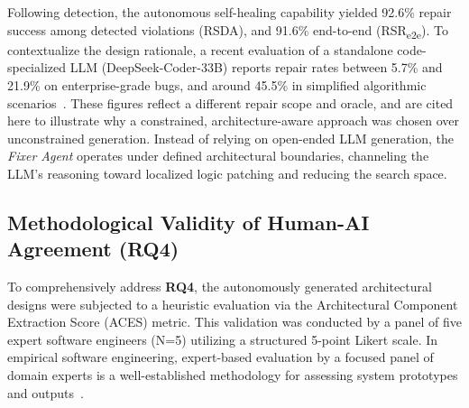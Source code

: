 Following detection, the autonomous self-healing capability yielded 92.6\% repair success among detected violations (RSDA), and 91.6\% end-to-end (RSR\textsubscript{e2e}). To contextualize the design rationale, a recent evaluation of a standalone code-specialized LLM (DeepSeek-Coder-33B) reports repair rates between 5.7\% and 21.9\% on enterprise-grade bugs, and around 45.5\% in simplified algorithmic scenarios~\citep{sun2025empirical}. These figures reflect a different repair scope and oracle, and are cited here to illustrate why a constrained, architecture-aware approach was chosen over unconstrained generation. Instead of relying on open-ended LLM generation, the \textit{Fixer Agent} operates under defined architectural boundaries, channeling the LLM's reasoning toward localized logic patching and reducing the search space.

\subsection{Methodological Validity of Human-AI Agreement (RQ4)}
\label{sec:discussion_rq4}

To comprehensively address \textbf{RQ4}, the autonomously generated architectural designs were subjected to a heuristic evaluation via the Architectural Component Extraction Score (ACES) metric. This validation was conducted by a panel of five expert software engineers (N=5) utilizing a structured 5-point Likert scale. In empirical software engineering, expert-based evaluation by a focused panel of domain experts is a well-established methodology for assessing system prototypes and outputs~\citep{monasor2014walk}.

